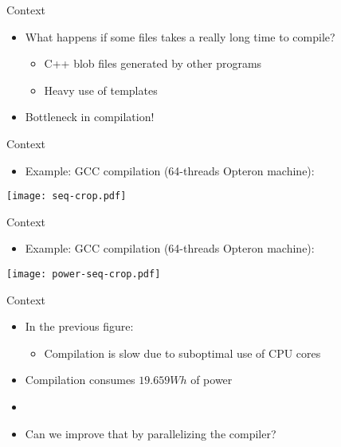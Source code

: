 
\begin{frame}{Context}
  \begin{itemize}
    \item What happens if some files takes a really long time to compile?
    \begin{itemize}
        \item C++ blob files generated by other programs
        \item Heavy use of templates
    \end{itemize}
    \item Bottleneck in compilation!
  \end{itemize}
\end{frame}


\begin{frame}{Context}
  \begin{itemize}
    \item Example: GCC compilation (64-threads Opteron machine):
  \end{itemize}

\begin{center}
\texttt{[image: seq-crop.pdf]}
\end{center}
\end{frame}


\begin{frame}{Context}
  \begin{itemize}
    \item Example: GCC compilation (64-threads Opteron machine):
  \end{itemize}

\begin{center}
\texttt{[image: power-seq-crop.pdf]}
\end{center}
\end{frame}


\begin{frame}{Context}
  \begin{itemize}
    \item In the previous figure:
    \begin{itemize}
        \item Compilation is slow due to suboptimal use of CPU cores
    \end{itemize}
    \item Compilation consumes $19.659Wh$ of power
    \item[]
    \item Can we improve that by parallelizing the compiler?
  \end{itemize}

\end{frame}

